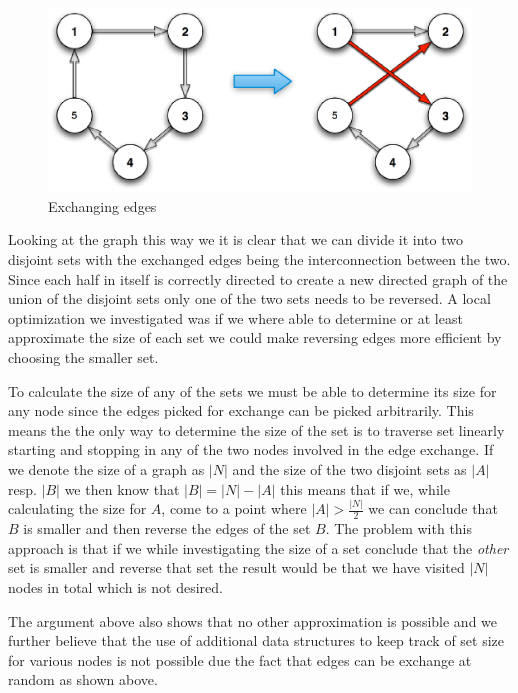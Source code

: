 \documentclass[a4paper,12pt,oneside]{article}
\begin{document}
\begin{figure}[h]
	\begin{center}
		\includegraphics[width=0.90\linewidth]{rev_edge_graph.eps}
	\end{center}
	\caption{Exchanging edges}
	\label{exchange}
\end{figure}


Looking at the graph this way we it is clear that we can divide it into two disjoint sets with the exchanged edges being the interconnection between the two. Since each half in itself is correctly directed to create a new directed graph of the union of the disjoint sets only one of the two sets needs to be reversed. A local optimization we investigated was if we where able to determine or at least approximate the size of each set we could make reversing edges more efficient by choosing the smaller set. 

To calculate the size of any of the sets we must be able to determine its size for any node since the edges picked for exchange can be picked arbitrarily. This means the the only way to determine the size of the set is to traverse set linearly starting and stopping in any of the two nodes involved in the edge exchange. If we denote the size of a graph as $|N|$ and the size of the two disjoint sets as $|A|$ resp. $|B|$ we then know that $|B| = |N| - |A|$ this means that if we, while calculating the size for $A$, come to a point where $|A| > \frac{|N|}{2}$ we can conclude that $B$ is smaller and then reverse the edges of the set $B$. The problem with this approach is that if we while investigating the size of a set conclude that the \textit{other} set is smaller and reverse that set the result would be that we have visited $|N|$ nodes in total which is not desired. 

The argument above also shows that no other approximation is possible and we further believe that the use of additional data structures to keep track of set size for various nodes is not possible due the fact that edges can be exchange at random as shown above.
\end{document}
